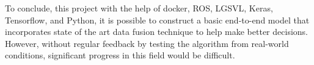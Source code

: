 To conclude, this project with the help of docker, ROS, LGSVL, Keras, Tensorflow, and Python, it is possible to construct a basic end-to-end model that incorporates state of the art data fusion technique to help make better decisions. However, without regular feedback by testing the algorithm from real-world conditions, significant progress in this field would be difficult. 